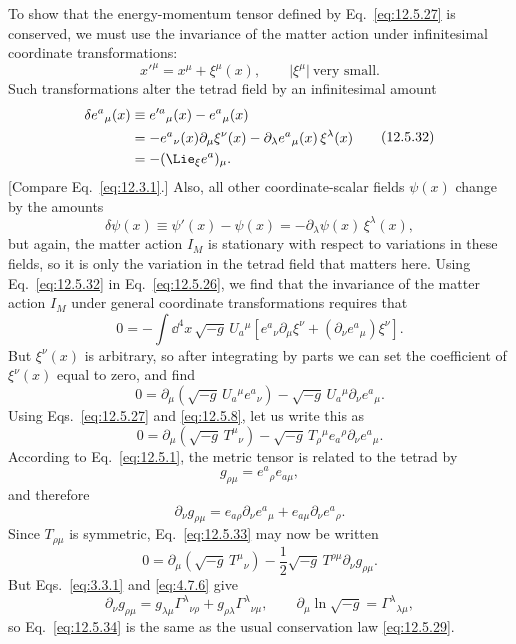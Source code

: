 To show that the energy-momentum tensor defined by
Eq.~\eqref{eq:12.5.27} is conserved, we must use the invariance of the matter
action under infinitesimal coordinate transformations:
\[
  x'^\mu=x^\mu+\xi^\mu(x),
  \qquad
  \lvert\xi^\mu\rvert\ \text{very small}.
\]
Such transformations alter the tetrad field by an infinitesimal amount
\begin{equation}
\begin{aligned}
  \delta e^a{}_\mu(x)
  &\equiv
  e'^a{}_\mu(x)-e^a{}_\mu(x)
  \\
  &=
  -e^a{}_\nu(x)\partial_\mu\xi^\nu(x)
  -\partial_\lambda e^a{}_\mu(x)\,\xi^\lambda(x)
  \\
  &=
  -(\Lie_\xi e^a)_\mu.
\end{aligned}
  \tag{12.5.32}\label{eq:12.5.32}
\end{equation}
[Compare Eq.~\eqref{eq:12.3.1}.] Also, all other coordinate-scalar fields
\(\psi(x)\) change by the amounts
\[
  \delta\psi(x)
  \equiv
  \psi'(x)-\psi(x)
  =
  -\partial_\lambda\psi(x)\,\xi^\lambda(x),
\]
but again, the matter action \(I_M\) is stationary with respect to variations
in these fields, so it is only the variation in the tetrad field that matters
here. Using Eq.~\eqref{eq:12.5.32} in Eq.~\eqref{eq:12.5.26}, we find that
the invariance of the matter action \(I_M\) under general coordinate
transformations requires that
\[
  0
  =
  -\int\dd^4x\,\sqrt{-g}\,U_a{}^\mu
  \left[
    e^a{}_\nu\partial_\mu\xi^\nu
    +(\partial_\nu e^a{}_\mu)\xi^\nu
  \right].
\]
But \(\xi^\nu(x)\) is arbitrary, so after integrating by parts we can set the
coefficient of \(\xi^\nu(x)\) equal to zero, and find
\[
  0
  =
  \partial_\mu\!\left(\sqrt{-g}\,U_a{}^\mu e^a{}_\nu\right)
  -\sqrt{-g}\,U_a{}^\mu\partial_\nu e^a{}_\mu.
\]
Using Eqs.~\eqref{eq:12.5.27} and \eqref{eq:12.5.8}, let us write this as
\begin{equation}
  0
  =
  \partial_\mu\!\left(\sqrt{-g}\,T^\mu{}_\nu\right)
  -\sqrt{-g}\,
   T_\rho{}^\mu e_a{}^\rho\partial_\nu e^a{}_\mu.
  \tag{12.5.33}\label{eq:12.5.33}
\end{equation}
According to Eq.~\eqref{eq:12.5.1}, the metric tensor is related to the
tetrad by
\[
  g_{\rho\mu}
  =
  e^a{}_\rho e_{a\mu},
\]
and therefore
\[
  \partial_\nu g_{\rho\mu}
  =
  e_{a\rho}\partial_\nu e^a{}_\mu
  +e_{a\mu}\partial_\nu e^a{}_\rho.
\]
Since \(T_{\rho\mu}\) is symmetric, Eq.~\eqref{eq:12.5.33} may now be written
\begin{equation}
  0
  =
  \partial_\mu\!\left(\sqrt{-g}\,T^\mu{}_\nu\right)
  -\frac12\sqrt{-g}\,T^{\rho\mu}\partial_\nu g_{\rho\mu}.
  \tag{12.5.34}\label{eq:12.5.34}
\end{equation}
But Eqs.~\eqref{eq:3.3.1} and \eqref{eq:4.7.6} give
\[
  \partial_\nu g_{\rho\mu}
  =
  g_{\lambda\mu}\Gamma^\lambda{}_{\nu\rho}
  +g_{\rho\lambda}\Gamma^\lambda{}_{\nu\mu},
  \qquad
  \partial_\mu\ln\sqrt{-g}
  =
  \Gamma^\lambda{}_{\lambda\mu},
\]
so Eq.~\eqref{eq:12.5.34} is the same as the usual conservation law
\eqref{eq:12.5.29}.

